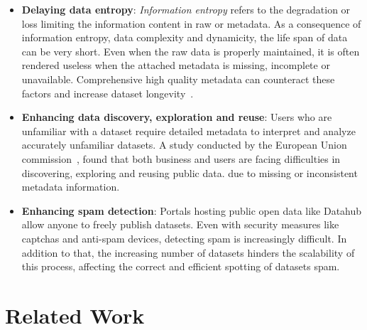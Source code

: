 \documentclass[runningheads,a4paper]{llncs}
\begin{document}
\begin{itemize}
  \item \textbf{Delaying data entropy}: \textit{Information entropy} refers to the degradation or loss limiting the information content in raw or metadata. As a consequence of information entropy, data complexity and dynamicity, the life span of data can be very short. Even when the raw data is properly maintained, it is often rendered useless when the attached metadata is missing, incomplete or unavailable. Comprehensive high quality metadata can counteract these factors and increase dataset longevity~\cite{GTOS}.
  \item \textbf{Enhancing data discovery, exploration and reuse}: Users who are unfamiliar with a dataset require detailed metadata to interpret and analyze accurately unfamiliar datasets. A study conducted by the European Union commission~\cite{Graham:11:}, found that both business and users are facing difficulties in discovering, exploring and reusing public data. due to missing or inconsistent metadata information.
  \item \textbf{Enhancing spam detection}: Portals hosting public open data like Datahub allow anyone to freely publish datasets. Even with security measures like captchas and anti-spam devices, detecting spam is increasingly difficult. In addition to that, the increasing number of datasets hinders the scalability of this process, affecting the correct and efficient spotting of datasets spam.
\end{itemize}


\section{Related Work}
\label{sec:related-work}
\end{document}
